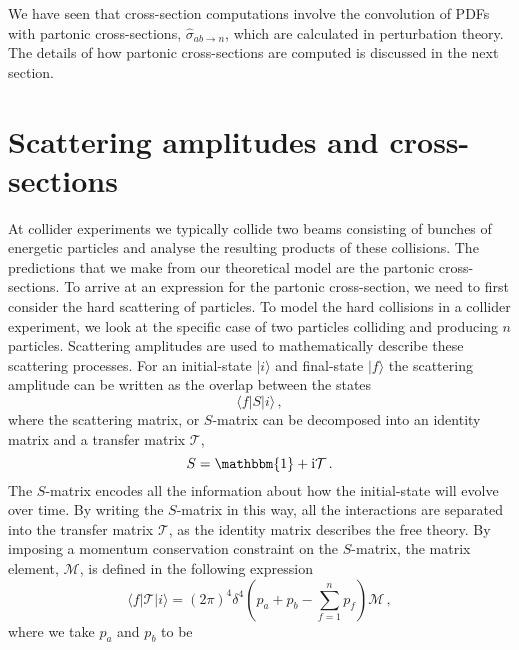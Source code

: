 \documentclass[main.tex]{subfiles}
\begin{document}
    We have seen that cross-section computations involve
    the convolution of PDFs with partonic cross-sections,
    $\hat{\sigma}_{ab \rightarrow n}$, which are
    calculated in perturbation theory.
    The details of how partonic cross-sections
    are computed is discussed in the next section.

\section{Scattering amplitudes and cross-sections}\label{sec:xs}
    At collider experiments we typically collide
    two beams consisting of bunches of energetic
    particles and analyse the resulting products
    of these collisions. The predictions that we make
    from our theoretical model are the partonic
    cross-sections. To arrive at an expression
    for the partonic cross-section, we need to
    first consider the hard scattering of particles.
    To model the hard collisions in
    a collider experiment, we look at the specific
    case of two particles colliding and producing $n$ particles.
    Scattering amplitudes are used to mathematically
    describe these scattering processes.
    For an initial-state
    $|i\rangle$ and final-state $|f\rangle$
    the scattering amplitude can be written as
    the overlap between the states
    \begin{equation}\label{eqn:scattering}
        \langle f | S | i \rangle \, ,
    \end{equation}
    where the scattering matrix, or $S$-matrix
    can be decomposed into an identity matrix
    and a transfer matrix $\mathcal{T}$,
    \begin{equation}\label{eqn:S_matrix}
        S = \mathbbm{1} + \mathrm{i}\mathcal{T} \, .
    \end{equation}
    The $S$-matrix encodes all the information
    about how the initial-state will evolve
    over time. By writing
    the $S$-matrix in this way, all the interactions
    are separated into the transfer matrix $\mathcal{T}$,
    as the identity matrix describes the free theory.
    By imposing a momentum conservation constraint
    on the $S$-matrix, the matrix element,
    $\mathcal{M}$, is defined in the following expression
    \begin{equation}\label{eqn:S_matrix_element}
        \langle f | \mathcal{T} | i \rangle = (2\pi)^{4} \delta^{4}\left(p_{a} + p_{b} - \sum_{f=1}^{n} p_{f}\right) \mathcal{M} \, ,
    \end{equation}
    where we take $p_{a}$ and $p_{b}$ to be
\end{document}

